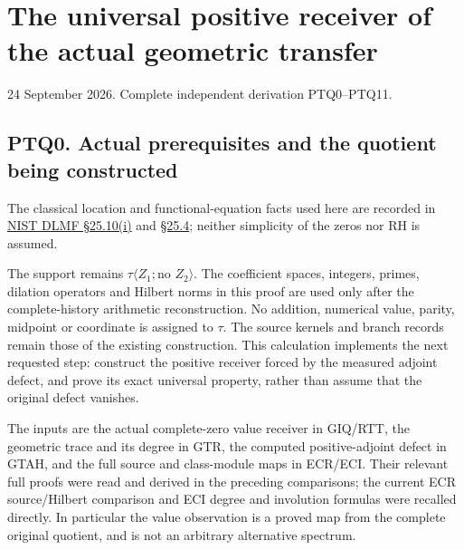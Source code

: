 \section{The universal positive receiver of the actual geometric
transfer}\label{the-universal-positive-receiver-of-the-actual-geometric-transfer}

24 September 2026. Complete independent derivation PTQ0--PTQ11.

\subsection{PTQ0. Actual prerequisites and the quotient being
constructed}\label{ptq0.-actual-prerequisites-and-the-quotient-being-constructed}

The classical location and functional-equation facts used here are
recorded in \href{https://dlmf.nist.gov/25.10\#i}{NIST DLMF §25.10(i)}
and \href{https://dlmf.nist.gov/25.4}{§25.4}; neither simplicity of the
zeros nor RH is assumed.

The support remains \(\tau\langle Z_1;\text{no }Z_2\rangle\). The
coefficient spaces, integers, primes, dilation operators and Hilbert
norms in this proof are used only after the complete-history arithmetic
reconstruction. No addition, numerical value, parity, midpoint or
coordinate is assigned to \(\tau\). The source kernels and branch
records remain those of the existing construction. This calculation
implements the next requested step: construct the positive receiver
forced by the measured adjoint defect, and prove its exact universal
property, rather than assume that the original defect vanishes.

The inputs are the actual complete-zero value receiver in GIQ/RTT, the
geometric trace and its degree in GTR, the computed positive-adjoint
defect in GTAH, and the full source and class-module maps in ECR/ECI.
Their relevant full proofs were read and derived in the preceding
comparisons; the current ECR source/Hilbert comparison and ECI degree
and involution formulas were recalled directly. In particular the value
observation is a proved map from the complete original quotient, and is
not an arbitrary alternative spectrum.

